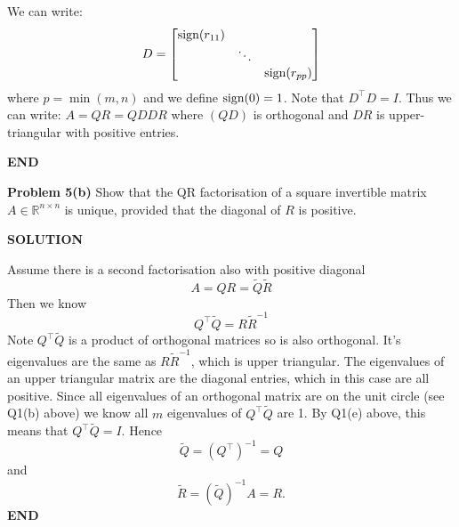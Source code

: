 \documentclass[12pt,a4paper]{article}
\def\bbR{ {\mathbb R} }
\def\Qt{ {\tilde Q} }
\def\Rt{ {\tilde R} }
\begin{document}
We can write:
\[
D = \begin{bmatrix} \hbox{sign}(r_{11}) \\ & \ensuremath{\ddots}  \\ && \hbox{sign}(r_{pp}) \end{bmatrix}
\]
where $p = \min(m,n)$ and we define $\hbox{sign}(0) = 1$. Note that $D^\ensuremath{\top} D = I$. Thus we can write: $A = Q R = Q D D R$ where $(QD)$ is orthogonal and $DR$ is upper-triangular with positive entries.

\textbf{END}

\textbf{Problem 5(b)} Show that the QR factorisation of a square invertible matrix $A \ensuremath{\in} \ensuremath{\bbR}^{n \ensuremath{\times} n}$ is unique, provided that the diagonal of $R$ is positive.

\textbf{SOLUTION}

Assume there is a second factorisation also with positive diagonal
\[
A = QR = \Qt  \Rt
\]
Then we know
\[
Q^\ensuremath{\top} \Qt  = R \Rt^{-1}
\]
Note $Q^\ensuremath{\top} \Qt $ is a product of orthogonal matrices so is also orthogonal. It's eigenvalues are the same as $R \Rt^{-1}$, which is upper triangular. The eigenvalues of an upper triangular matrix are the diagonal entries, which in this case are all positive. Since all eigenvalues of an orthogonal matrix are on the unit circle (see Q1(b) above) we know all $m$ eigenvalues of $Q^\ensuremath{\top} \Qt$ are 1. By Q1(e) above, this means that $Q^\ensuremath{\top} \Qt  = I$. Hence
\[
\Qt = (Q^\ensuremath{\top})^{-1} = Q
\]
and
\[
\Rt = (\Qt)^{-1}A =  R.
\]
\textbf{END}
\end{document}
